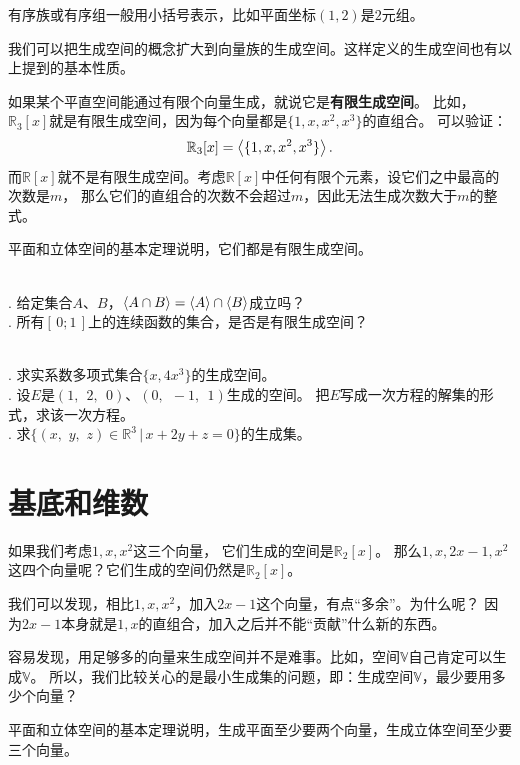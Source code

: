 \documentclass[12pt,UTF8]{ctexbook}
\begin{document}
有序族或有序组一般用小括号表示，比如平面坐标$(1,2)$是$2$元组。

我们可以把生成空间的概念扩大到向量族的生成空间。这样定义的生成空间也有以上提到的基本性质。

如果某个平直空间能通过有限个向量生成，就说它是\textbf{有限生成空间}。
比如，$\mathbb{R}_3[x]$就是有限生成空间，因为每个向量都是$\{1, x, x^2, x^3\}$的直组合。
可以验证：
$$\mathbb{R}_3[x] = \left\langle \{1, x, x^2, x^3\} \right\rangle.$$
而$\mathbb{R}[x]$就不是有限生成空间。考虑$\mathbb{R}[x]$中任何有限个元素，设它们之中最高的次数是$m$，
那么它们的直组合的次数不会超过$m$，因此无法生成次数大于$m$的整式。

平面和立体空间的基本定理说明，它们都是有限生成空间。

\begin{sk}
    \mbox{} \\
    . 给定集合$A$、$B$，$\left\langle A\cap B \right\rangle = \left\langle A \right\rangle\cap\left\langle B \right\rangle$成立吗？\\
    . 所有$[\,0;1\,]$上的连续函数的集合，是否是有限生成空间？
\end{sk}

\begin{xt}
    \mbox{} \\
    . 求实系数多项式集合$\{x, 4x^3\}$的生成空间。\\
    . 设$E$是$(1, \;\,2, \;\,0)$、$(0, \;\,-1, \;\,1)$生成的空间。
    把$E$写成一次方程的解集的形式，求该一次方程。\\
    . 求$\{(x,\,\,y,\,\,z)\in\mathbb{R}^3 \, | \, x + 2y + z = 0 \}$的生成集。
    
\end{xt}

\section{基底和维数}

如果我们考虑$1,x,x^2$这三个向量，
它们生成的空间是$\mathbb{R}_2[x]$。
那么$1,x,2x-1,x^2$这四个向量呢？它们生成的空间仍然是$\mathbb{R}_2[x]$。

我们可以发现，相比$1,x,x^2$，加入$2x-1$这个向量，有点“多余”。为什么呢？
因为$2x-1$本身就是$1, x$的直组合，加入之后并不能“贡献”什么新的东西。

容易发现，用足够多的向量来生成空间并不是难事。比如，空间$\mathbb{V}$自己肯定可以生成$\mathbb{V}$。
所以，我们比较关心的是最小生成集的问题，即：生成空间$\mathbb{V}$，最少要用多少个向量？

平面和立体空间的基本定理说明，生成平面至少要两个向量，生成立体空间至少要三个向量。
\end{document}
